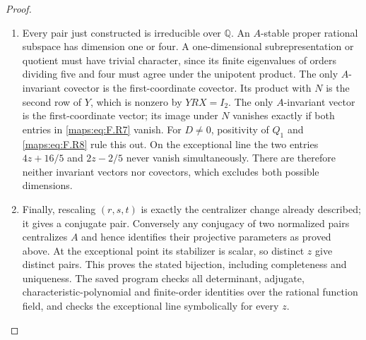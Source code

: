 \documentclass[11pt,a4paper]{article}
\theoremstyle{definition}
\begin{document}
\begin{proof}
\begin{enumerate}[label=\arabic*.]
\item Every pair just constructed is irreducible over $\mathbb Q$.
An $A$-stable proper rational subspace has dimension one or
four.  A one-dimensional subrepresentation or quotient must
have trivial character, since its finite eigenvalues of
orders dividing five and four must agree under the
unipotent product.  The only $A$-invariant covector is the
first-coordinate covector.  Its product with $N$ is the
second row of $Y$, which is nonzero by $YRX=I_2$.
The only $A$-invariant vector is the first-coordinate vector;
its image under $N$ vanishes exactly if both entries in
\eqref{maps:eq:F.R7} vanish.  For $D\ne0$, positivity of $Q_1$ and
\eqref{maps:eq:F.R8} rule this out.  On the exceptional line the two
entries $4z+16/5$ and $2z-2/5$ never vanish simultaneously.
There are therefore neither invariant vectors nor covectors,
which excludes both possible dimensions.

\item Finally, rescaling $(r,s,t)$ is exactly the centralizer
change already described; it gives a conjugate pair.
Conversely any conjugacy of two normalized pairs centralizes
$A$ and hence identifies their projective parameters as proved
above.  At the exceptional point its stabilizer is scalar,
so distinct $z$ give distinct pairs.  This proves the stated
bijection, including completeness and uniqueness.
The saved program checks all determinant, adjugate,
characteristic-polynomial and finite-order identities over
the rational function field, and checks the exceptional
line symbolically for every $z$.

\end{enumerate}
\end{proof}
\end{document}
